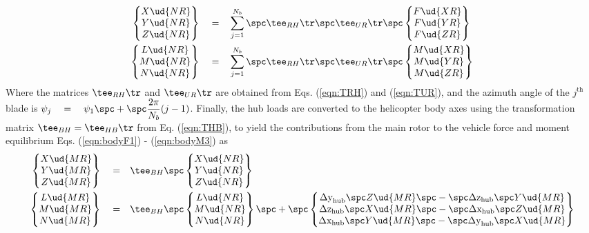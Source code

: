 \begin{align*}
\begin{Bmatrix} X\ud{NR} \\ Y\ud{NR} \\ Z\ud{NR} \end{Bmatrix} \quad = \quad & \sum_{j=1}^{N_b} \spc \tee_{RH}\tr \spc \tee_{UR}\tr \spc \begin{Bmatrix} F\ud{XR} \\ F\ud{YR} \\ F\ud{ZR} \end{Bmatrix}  \\
\begin{Bmatrix} L\ud{NR} \\ M\ud{NR} \\ N\ud{NR} \end{Bmatrix} \quad = \quad & \sum_{j=1}^{N_b} \spc \tee_{RH}\tr \spc \tee_{UR}\tr \spc \begin{Bmatrix} M\ud{XR} \\ M\ud{YR} \\ M\ud{ZR} \end{Bmatrix} 
\end{align*}
Where the matrices $\tee_{RH}\tr$ and $\tee_{UR}\tr$ are obtained from Eqs. (\ref{eqn:TRH}) and (\ref{eqn:TUR}), and the azimuth angle of the $j^\textrm{th}$ blade is $\displaystyle \psi_j \quad = \quad \psi_1 \spc + \spc \frac{2\pi}{N_b}(j-1)$. Finally, the hub loads are converted to the helicopter body axes using the transformation matrix $\tee_{BH} = \tee_{HB}\tr$ from Eq. (\ref{eqn:THB}), to yield the contributions from the main rotor to the vehicle force and moment equilibrium Eqs. (\ref{eqn:bodyF1}) - (\ref{eqn:bodyM3}) as 
\begin{align}
\label{eqn:XYZMR}
\begin{Bmatrix} X\ud{MR} \\ Y\ud{MR} \\ Z\ud{MR} \end{Bmatrix} \quad = \quad &\tee_{BH} \spc \begin{Bmatrix} X\ud{NR} \\ Y\ud{NR} \\ Z\ud{NR} \end{Bmatrix} \\
\label{eqn:LMNMR}
\begin{Bmatrix} L\ud{MR} \\ M\ud{MR} \\ N\ud{MR} \end{Bmatrix} \quad = \quad &\tee_{BH} \spc \begin{Bmatrix} L\ud{NR} \\ M\ud{NR} \\ N\ud{NR} \end{Bmatrix} \spc + \spc \begin{Bmatrix} \Delta \textrm{y}_\textrm{hub} \spc Z\ud{MR} \spc - \spc \Delta \textrm{z}_\textrm{hub} \spc Y\ud{MR} \\ \Delta \textrm{z}_\textrm{hub} \spc X\ud{MR} \spc - \spc \Delta \textrm{x}_\textrm{hub} \spc Z\ud{MR} \\ \Delta \textrm{x}_\textrm{hub} \spc Y\ud{MR} \spc - \spc \Delta \textrm{y}_\textrm{hub} \spc X\ud{MR} \end{Bmatrix}
\end{align}
